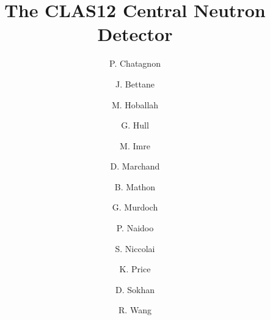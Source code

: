 \title{The CLAS12 Central Neutron Detector}

\author[A]{P. Chatagnon}
\author[A]{J. Bettane}
\author[A]{M. Hoballah}
\author[A]{G. Hull}
\author[A]{M. Imre}
\author[A]{D. Marchand}
\author[A]{B. Mathon}
\author[B]{G. Murdoch}
\author[B]{P. Naidoo}
\author[A]{S. Niccolai}
\author[A]{K. Price}
\author[B]{D. Sokhan}
\author[A]{R. Wang}

\address[A]{Institut de Physique Nucl\'eaire, CNRS-IN2P3, Univ. Paris-Sud, Universit\'e Paris-Saclay, 91406 Orsay Cedex, France}
\address[B]{University of Glasgow, Glasgow G12 8QQ, United Kingdom}

